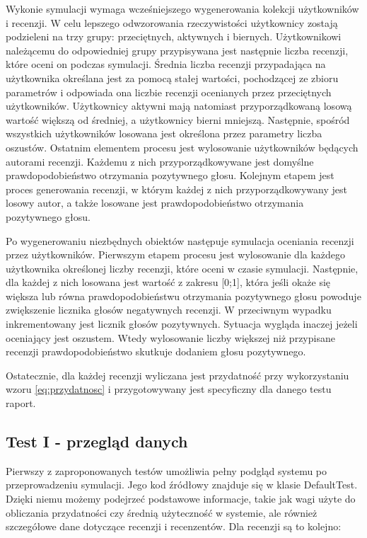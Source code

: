 Wykonie symulacji wymaga wcześniejszego wygenerowania kolekcji użytkowników i recenzji. W celu lepszego odwzorowania rzeczywistości użytkownicy zostają podzieleni na trzy grupy: przeciętnych, aktywnych i biernych. Użytkownikowi należącemu do odpowiedniej grupy przypisywana jest następnie liczba recenzji, które oceni on podczas symulacji. Średnia liczba recenzji przypadająca na użytkownika określana jest za pomocą stałej wartości, pochodzącej ze zbioru parametrów i odpowiada ona liczbie recenzji ocenianych przez przeciętnych użytkowników. Użytkownicy aktywni mają natomiast przyporządkowaną losową wartość większą od średniej, a użytkownicy bierni mniejszą. Następnie, spośród wszystkich użytkowników losowana jest określona przez parametry liczba oszustów. Ostatnim elementem procesu jest wylosowanie użytkowników będących autorami recenzji. Każdemu z nich przyporządkowywane jest domyślne prawdopodobieństwo otrzymania pozytywnego głosu. Kolejnym etapem jest proces generowania recenzji, w którym każdej z nich przyporządkowywany jest losowy autor, a także losowane jest prawdopodobieństwo otrzymania pozytywnego głosu.

Po wygenerowaniu niezbędnych obiektów następuje symulacja oceniania recenzji przez użytkowników. Pierwszym etapem procesu jest wylosowanie dla każdego użytkownika określonej liczby recenzji, które oceni w czasie symulacji. Następnie, dla każdej z nich losowana jest wartość z zakresu [0;1], która jeśli okaże się większa lub równa prawdopodobieństwu otrzymania pozytywnego głosu powoduje zwiększenie licznika głosów negatywnych recenzji. W przeciwnym wypadku inkrementowany jest licznik głosów pozytywnych. Sytuacja wygląda inaczej jeżeli oceniający jest oszustem. Wtedy wylosowanie liczby większej niż przypisane recenzji prawdopodobieństwo skutkuje dodaniem głosu pozytywnego. 

Ostatecznie, dla każdej recenzji wyliczana jest przydatność przy wykorzystaniu wzoru \ref{eq:przydatnosc} i przygotowywany jest specyficzny dla danego testu raport.

\subsection{Test I - przegląd danych}

Pierwszy z zaproponowanych testów umożliwia pełny podgląd systemu po przeprowadzeniu symulacji. Jego kod źródłowy znajduje się w klasie DefaultTest. Dzięki niemu możemy podejrzeć podstawowe informacje, takie jak wagi użyte do obliczania przydatności czy średnią użyteczność w systemie, ale również szczegółowe dane dotyczące recenzji i recenzentów. Dla recenzji są to kolejno:

